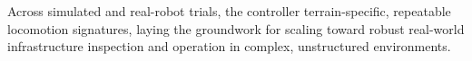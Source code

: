 %

Across simulated and real-robot trials, the controller  terrain-specific, repeatable locomotion signatures, laying the groundwork for scaling toward robust real-world infrastructure inspection and operation in complex, unstructured environments.
